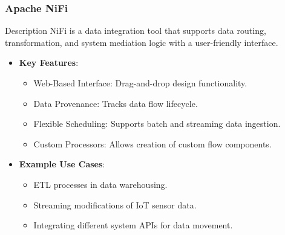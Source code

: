 \documentclass[aspectratio=169]{beamer}
\begin{document}
\begin{frame}[fragile]
    \frametitle{Apache NiFi}
    
    \begin{block}{Description}
        NiFi is a data integration tool that supports data routing, transformation, and system mediation logic with a user-friendly interface.
    \end{block}
    
    \begin{itemize}
        \item \textbf{Key Features}:
            \begin{itemize}
                \item Web-Based Interface: Drag-and-drop design functionality.
                \item Data Provenance: Tracks data flow lifecycle.
                \item Flexible Scheduling: Supports batch and streaming data ingestion.
                \item Custom Processors: Allows creation of custom flow components.
            \end{itemize}
        \item \textbf{Example Use Cases}:
            \begin{itemize}
                \item ETL processes in data warehousing.
                \item Streaming modifications of IoT sensor data.
                \item Integrating different system APIs for data movement.
            \end{itemize}
    \end{itemize}
\end{frame}
\end{document}

